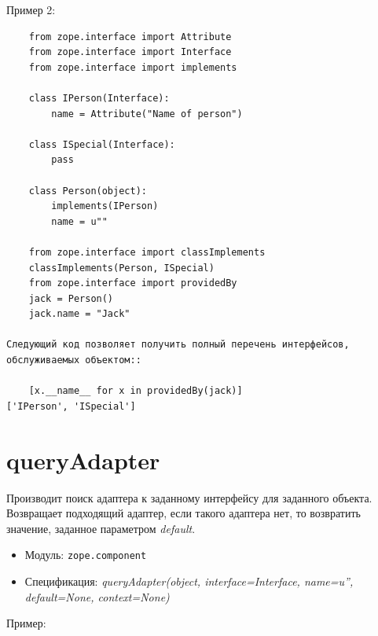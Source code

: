 \documentclass[a4paper,openany,twoside,final]{book}
\providecommand*{\DUroletitlereference}[1]{\textsl{#1}}
\begin{document}
Пример 2:

\begin{verbatim}
    from zope.interface import Attribute
    from zope.interface import Interface
    from zope.interface import implements

    class IPerson(Interface):
        name = Attribute("Name of person")

    class ISpecial(Interface):
        pass

    class Person(object):
        implements(IPerson)
        name = u""

    from zope.interface import classImplements
    classImplements(Person, ISpecial)
    from zope.interface import providedBy
    jack = Person()
    jack.name = "Jack"

Следующий код позволяет получить полный перечень интерфейсов,
обслуживаемых объектом::

    [x.__name__ for x in providedBy(jack)]
['IPerson', 'ISpecial']
\end{verbatim}


\section*{queryAdapter%
  \label{queryadapter}%
}

Производит поиск адаптера к заданному интерфейсу для заданного объекта.  Возвращает подходящий адаптер, если такого адаптера нет, то возвратить значение, заданное параметром \DUroletitlereference{default}.

\begin{itemize}

\item Модуль: \texttt{zope.component}

\item Спецификация: \DUroletitlereference{queryAdapter(object, interface=Interface, name=u'', default=None, context=None)}

\end{itemize}

Пример:
\end{document}
